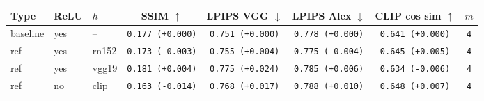 \begin{tabular}{|l|l|l|c|c|c|c|c|}
\hline
Type & ReLU & $h$ & SSIM $\uparrow$ & LPIPS VGG $\downarrow$ & LPIPS Alex $\downarrow$ & CLIP cos sim $\uparrow$ & $m$ \\
\hline
\rowcolor{verylightgray}baseline & yes & -- & \texttt{0.177 {\color{black}(+0.000)}} & \texttt{0.751 {\color{black}(+0.000)}} & \texttt{0.778 {\color{black}(+0.000)}} & \texttt{0.641 {\color{black}(+0.000)}} & \texttt{4} \\
\hline
ref & yes & rn152 & \texttt{0.173 {\color{red}(-0.003)}} & \texttt{0.755 {\color{red}(+0.004)}} & \texttt{0.775 {\color{green}(-0.004)}} & \texttt{0.645 {\color{green}(+0.005)}} & \texttt{4} \\
\hline
ref & yes & vgg19 & \texttt{0.181 {\color{green}(+0.004)}} & \texttt{0.775 {\color{red}(+0.024)}} & \texttt{0.785 {\color{red}(+0.006)}} & \texttt{0.634 {\color{red}(-0.006)}} & \texttt{4} \\
\hline
ref & no & clip & \texttt{0.163 {\color{red}(-0.014)}} & \texttt{0.768 {\color{red}(+0.017)}} & \texttt{0.788 {\color{red}(+0.010)}} & \texttt{0.648 {\color{green}(+0.007)}} & \texttt{4} \\
\hline
\end{tabular}
